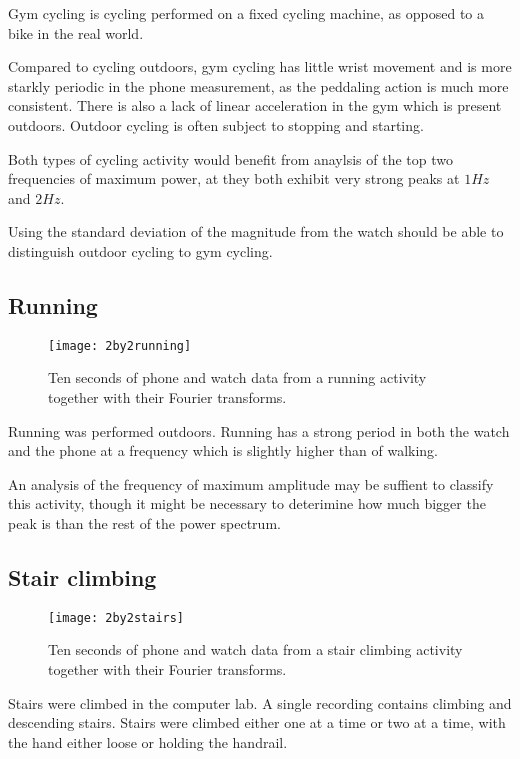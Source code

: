       Gym cycling is cycling performed on a fixed cycling machine, as opposed to a bike in the real world.
      
      Compared to cycling outdoors, gym cycling has little wrist movement and is more starkly periodic in the phone measurement, as the peddaling action is much more consistent. There is also a lack of linear acceleration in the gym which is present outdoors. Outdoor cycling is often subject to stopping and starting.
      
      Both types of cycling activity would benefit from anaylsis of the top two frequencies of maximum power, at they both exhibit very strong peaks at $1 \si{Hz}$ and $2 \si{Hz}$.
      
      Using the standard deviation of the magnitude from the watch should be able to distinguish outdoor cycling to gym cycling.
    \subsection{Running}
      \begin{figure}[!th]
        \centering
        \texttt{[image: 2by2running]}
        \caption{Ten seconds of phone and watch data from a running activity together with their Fourier transforms.}
        \label{fig:2by2running}
      \end{figure}
      
      Running was performed outdoors. Running has a strong period in both the watch and the phone at a frequency which is slightly higher than of walking.
      
      An analysis of the frequency of maximum amplitude may be suffient to classify this activity, though it might be necessary to deterimine how much bigger the peak is than the rest of the power spectrum.
      
    \subsection{Stair climbing}
      \begin{figure}[!th]
        \centering
        \texttt{[image: 2by2stairs]}
        \caption{Ten seconds of phone and watch data from a stair climbing activity together with their Fourier transforms.}
        \label{fig:2by2stairs}
      \end{figure}
      Stairs were climbed in the computer lab. A single recording contains climbing and descending stairs. Stairs were climbed either one at a time or two at a time, with the hand either loose or holding the handrail.
      

